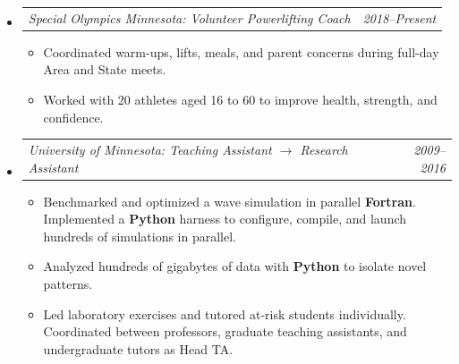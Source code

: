 \documentclass[12pt,letterpaper]{article}
\makeatletter
\newcommand{\headerpair}[2]{
    \begin{tabular*}{\linewidth}{l@{ \extracolsep{\fill} }r} {\large\emph{#1}} & {\large\emph{#2}}
    \end{tabular*}
}
\newcommand{\headerrow}[3]{\headerpair{#2: #1}{#3}}
\makeatother
\begin{document}
\begin{itemize}[leftmargin=\parindent]
\begin{itemize}[leftmargin=\parindent]
        \end{itemize}

    \item[]
        \headerrow
            {Volunteer Powerlifting Coach}
            {Special Olympics Minnesota}
            {2018--Present}
        \begin{itemize}[leftmargin=\parindent]
            \item Coordinated warm-ups, lifts, meals, and parent concerns during full-day Area and State meets.
            \item Worked with 20 athletes aged 16 to 60 to improve health, strength, and confidence.
        \end{itemize}

    \item[]
        \headerrow
            {Teaching Assistant $\to$ Research Assistant}
            {University of Minnesota}
            {2009--2016}
        \begin{itemize}[leftmargin=\parindent]
            \item Benchmarked and optimized a wave simulation in parallel \textbf{Fortran}. Implemented a \textbf{Python} harness to configure, compile, and launch hundreds of simulations in parallel.
            \item Analyzed hundreds of gigabytes of data with \textbf{Python} to isolate novel patterns.
            \item Led laboratory exercises and tutored at-risk students individually. Coordinated between professors, graduate teaching assistants, and undergraduate tutors as Head TA.
        \end{itemize}

\end{itemize}
\end{document}

